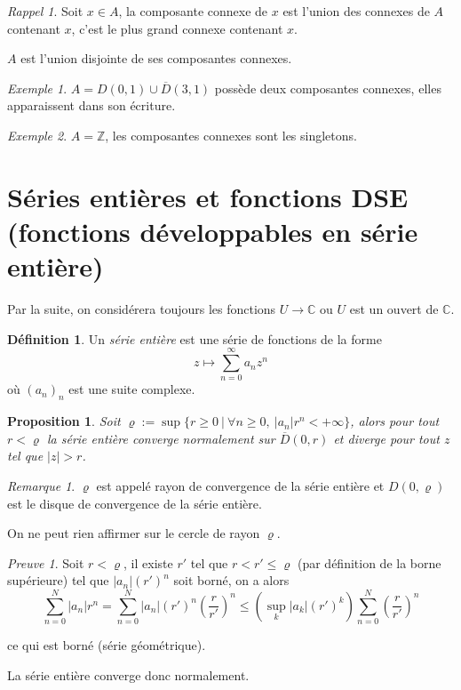 \documentclass[]{article}
\newtheorem{myproposition}{Proposition}
\theoremstyle{remark}
\newtheorem{myrem}{Remarque}
\newtheorem{myproof}{Preuve}
\newtheorem{myexmpl}{Exemple}
\newtheorem{myrapl}{Rappel}
\theoremstyle{definition}
\newtheorem{mydef}{Définition}
\begin{document}
\begin{myrapl}
	Soit $x \in A$, la composante connexe de $x$ est l'union des connexes de $A$ contenant $x$, c'est le plus grand connexe contenant $x$.

	$A$ est l'union disjointe de ses composantes connexes.
\end{myrapl}

\begin{myexmpl}
	$A = D(0, 1) \cup \overline{D}(3, 1)$ possède deux composantes connexes, elles apparaissent dans son écriture.
\end{myexmpl}

\begin{myexmpl}
	$A = \mathbb{Z}$, les composantes connexes sont les singletons.
\end{myexmpl}

\section{Séries entières et fonctions DSE (fonctions développables en série entière)}

Par la suite, on considérera toujours les fonctions $U \longrightarrow \mathbb{C}$ ou $U$ est un ouvert de $\mathbb{C}$.

\begin{mydef}
	Un \textit{série entière} est une série de fonctions de la forme $$z \longmapsto \sum_{n = 0}^{\infty} a_n z^n$$ où $(a_n)_n$ est une suite complexe.
\end{mydef}

\begin{myproposition}
	Soit $\varrho := \sup \{r \geqslant 0 ~ | ~ \forall n \geqslant 0, ~ |a_n|r^n < +\infty\}$, alors pour tout $r < \varrho$ la série entière converge normalement sur $\overline{D}(0, r)$ et diverge pour tout $z$ tel que $|z| > r$.
\end{myproposition}

\begin{myrem}
	$\varrho$ est appelé rayon de convergence de la série entière et $D(0, \varrho)$ est le disque de convergence de la série entière.
	
	On ne peut rien affirmer sur le cercle de rayon $\varrho$.
\end{myrem}

\begin{myproof}
	Soit $r < \varrho$, il existe $r'$ tel que $r < r' \leqslant \varrho$ (par définition de la borne supérieure) tel que $|a_n|(r')^n$ soit borné, on a alors $$\sum_{n = 0}^{N} |a_n| r^n = \sum_{n = 0}^{N} |a_n| (r')^n \left(\frac{r}{r'}\right)^n \leqslant \left(\sup_k |a_k|(r')^k\right) \sum_{n=0}^{N} \left(\frac{r}{r'}\right)^n$$
	
	ce qui est borné (série géométrique).
	
	La série entière converge donc normalement.
\end{myproof}
\end{document}
